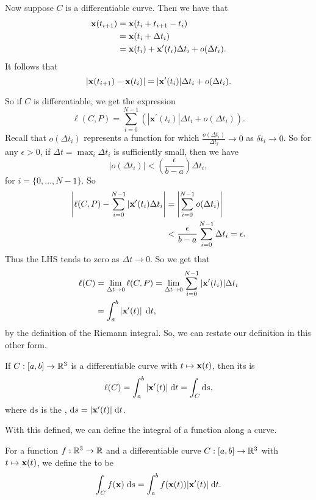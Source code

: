 \documentclass[a4paper]{scrreprt}
\begin{document}
Now suppose $C$ is a differentiable curve. Then we have that
\begin{align*}
	\mathbf{x}(t_{i + 1}) &= \mathbf{x}(t_i + t_{i + 1} - t_i) \\
					&= \mathbf{x}(t_i + \Delta t_i) \\
					&= \mathbf{x}(t_i) + \mathbf{x}'(t_i) \Delta t_i + o(\Delta t_i).
\end{align*}
It follows that
$$
|\mathbf{x}(t_{i + 1}) - \mathbf{x}(t_i) | = |\mathbf{x}'(t_i)| \Delta t_i + o(\Delta t_i). 
$$

So if $C$ is differentiable, we get the expression
$$
\ell(C, P)=\sum_{i=0}^{N-1}\left(\left|\mathbf{x}^{\prime}\left(t_{i}\right)\right| \Delta t_{i}+o\left(\Delta t_{i}\right)\right).
$$
Recall that $o(\Delta t_i)$ represents a function for which $\frac{o(\Delta t_i)}{\Delta t_i} \rightarrow 0$ as $\delta t_i \rightarrow 0$. So for any $\epsilon > 0$, if $\Delta t = \max_i \Delta t_i$  is sufficiently small, then we have
$$
|o(\Delta t_i) | < \left(\frac{\epsilon}{b - a}\right) \Delta t_i,
$$
for $i = \{0, \dots, N - 1\}$. So
\begin{align*}
	\left|\ell(C, P) - \sum_{i = 0}^{N - 1} |\mathbf{x}' (t_i) \Delta t_i \right| &= \left|\sum_{i = 0}^{N - 1} o(\Delta t_i)\right| \\
	&< \frac{\epsilon}{b - a} \sum_{i = 0}^{N - 1} \Delta{t_i} = \epsilon.
\end{align*}
Thus the LHS tends to zero as $\Delta t \rightarrow 0$. So we get that
\begin{align*}
	\ell(C) &= \lim_{\Delta t \to 0} \ell(C, P) = \lim_{\Delta t \to 0} \sum_{i = 0}^{N - 1} |\mathbf{x}'(t_i)| \Delta t_i \\
		&= \int_a^b \left|\mathbf{x}'(t)\right| \; \mathrm{d} t,
\end{align*}
by the definition of the Riemann integral.
So, we can restate our definition in this other form.

\begin{definition}
	If $C: [a, b] \rightarrow \mathbb{R}^3$ is a differentiable curve with $t \mapsto \mathbf{x}(t)$, then its  is
	$$
	\ell(C) = \int_a^b |\mathbf{x}'(t)| \; \mathrm{d}t = \int_C \mathrm{d} s,
	$$
where $\mathrm{d}s$ is the , $\mathrm{d}s = |\mathbf{x}'(t)| \; \mathrm{d}t$.
\end{definition}

With this defined, we can define the integral of a function along a curve.

\begin{definition}
	For a function $f : \mathbb{R}^3 \rightarrow \mathbb{R}$ and a differentiable curve $C: [a, b] \rightarrow \mathbb{R}^3$ with $t \mapsto \mathbf{x}(t)$, we define the  to be
	$$
	\int_C f(\mathbf{x})\; \mathrm{d}s = \int_a^b f(\mathbf{x}(t)) |\mathbf{x}'(t)| \; \mathrm{d}t.
	$$
\end{definition}
\end{document}
